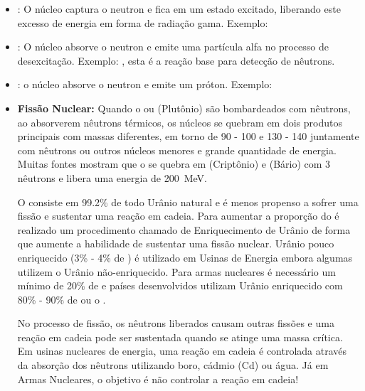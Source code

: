 \documentclass[11pt,a4paper]{article}
\begin{document}
                \begin{itemize}
                    \item {}: O núcleo captura o neutron e fica em um estado excitado, liberando este excesso de energia em forma de radiação gama. Exemplo: 
                    
                    \item {}: O núcleo absorve o neutron e emite uma partícula alfa no processo de desexcitação. Exemplo: , esta é a reação base para detecção de nêutrons.
                    
                    \item {}: o núcleo absorve o neutron e emite um próton. Exemplo: 
                    
                    \item \textbf{Fissão Nuclear:} Quando o  ou  (Plutônio) são bombardeados com nêutrons, ao absorverem nêutrons térmicos, os núcleos se quebram em dois produtos principais com massas diferentes, em torno de 90 - 100 e 130 - 140 juntamente com nêutrons ou outros núcleos menores e grande quantidade de energia. Muitas fontes mostram que o  se quebra em  (Criptônio) e  (Bário) com 3 nêutrons e libera uma energia de \qty{200}{MeV}.
                    
                        O  consiste em 99.2\% de todo Urânio natural e é menos propenso a sofrer uma fissão e  sustentar uma reação em cadeia. Para aumentar a proporção do  é realizado um procedimento chamado de Enriquecimento de Urânio de forma que aumente a habilidade de sustentar uma fissão nuclear. Urânio pouco enriquecido (3\% - 4\% de ) é utilizado em Usinas de Energia embora algumas utilizem o Urânio não-enriquecido. Para armas nucleares é necessário um mínimo de 20\% de  e países desenvolvidos utilizam Urânio enriquecido com 80\% - 90\% de  ou o .

                        No processo de fissão, os nêutrons liberados causam outras fissões e uma reação em cadeia pode ser sustentada quando se atinge uma massa crítica. Em usinas nucleares de energia, uma reação em cadeia é controlada através da absorção dos nêutrons utilizando boro, cádmio (Cd) ou água. Já em Armas Nucleares, o objetivo é não controlar a reação em cadeia! 
                \end{itemize}
\end{document}
